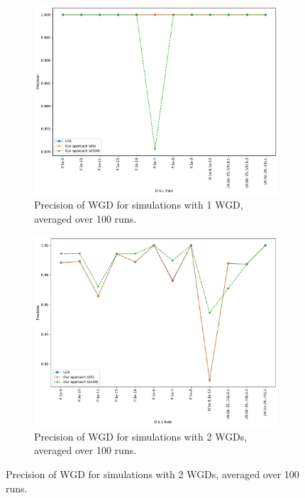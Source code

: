 \documentclass[10pt]{article}
\begin{document}
\begin{figure}[h!]
    \begin{subfigure}[b]{0.48\textwidth}
        \centering
        \includegraphics[width=\textwidth]{figs/precision-WGD-t10-t80-Avg.pdf}
        \caption{Precision of WGD for simulations with 1 WGD, averaged over 100 runs.}
        \label{fig:precision-wgd-1wgd_old}
    \end{subfigure}
    \hfill
    \begin{subfigure}[b]{0.48\textwidth}
        \centering
        \includegraphics[width=\textwidth]{figs/precision-2W-WGD-t20-t80-Avg.pdf}
        \caption{Precision of WGD for simulations with 2 WGDs, averaged over 100 runs.}
        \label{fig:precision-wgd-2wgd}
    \end{subfigure}
    

\end{figure}
\end{document}
